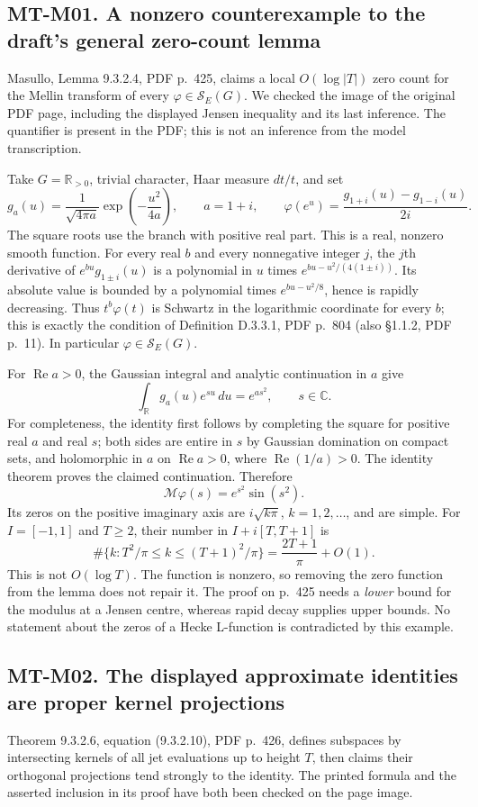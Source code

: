\documentclass[11pt,a4paper]{article}
\begin{document}
\subsection*{MT-M01. A nonzero counterexample to the draft's general zero-count lemma}
Masullo, Lemma 9.3.2.4, PDF p.~425, claims a local $O(\log |T|)$ zero count
for the Mellin transform of every $\varphi\in\mathcal S_E(G)$.
We checked the image of the original PDF page, including the displayed
Jensen inequality and its last inference.  The quantifier is present in the
PDF; this is not an inference from the model transcription.

Take $G=\mathbb R_{>0}$, trivial character, Haar measure $dt/t$, and set
\[
 g_a(u)=\frac{1}{\sqrt{4\pi a}}\exp\left(-\frac{u^2}{4a}\right),
 \qquad a=1+i,\qquad
 \varphi(e^u)=\frac{g_{1+i}(u)-g_{1-i}(u)}{2i}.
\]
The square roots use the branch with positive real part.  This is a real,
nonzero smooth function.  For every real $b$ and every nonnegative integer
$j$, the $j$th derivative of $e^{bu}g_{1\pm i}(u)$ is a polynomial in $u$
times $e^{bu-u^2/(4(1\pm i))}$.  Its absolute value is bounded by a
polynomial times $e^{bu-u^2/8}$, hence is rapidly decreasing.  Thus
$t^b\varphi(t)$ is Schwartz in the logarithmic coordinate for every $b$;
this is exactly the condition of Definition D.3.3.1, PDF p.~804 (also
\S1.1.2, PDF p.~11).  In particular $\varphi\in\mathcal S_E(G)$.

For $\operatorname{Re}a>0$, the Gaussian integral and analytic continuation
in $a$ give
\[
 \int_{\mathbb R}g_a(u)e^{su}\,du=e^{as^2},\qquad s\in\mathbb C.
\]
For completeness, the identity first follows by completing the square for
positive real $a$ and real $s$; both sides are entire in $s$ by Gaussian
domination on compact sets, and holomorphic in $a$ on
$\operatorname{Re}a>0$, where $\operatorname{Re}(1/a)>0$.  The identity
theorem proves the claimed continuation.  Therefore
\[
 \mathcal M\varphi(s)=e^{s^2}\sin(s^2).
\]
Its zeros on the positive imaginary axis are
$i\sqrt{k\pi}$, $k=1,2,\ldots$, and are simple.  For $I=[-1,1]$ and
$T\ge2$, their number in $I+i[T,T+1]$ is
\[
 \#\{k:T^2/\pi\le k\le(T+1)^2/\pi\}
   =\frac{2T+1}{\pi}+O(1).
\]
This is not $O(\log T)$.  The function is nonzero, so removing the zero
function from the lemma does not repair it.  The proof on p.~425 needs a
\emph{lower} bound for the modulus at a Jensen centre, whereas rapid decay
supplies upper bounds.  No statement about the zeros of a Hecke L-function
is contradicted by this example.

\subsection*{MT-M02. The displayed approximate identities are proper kernel projections}
Theorem 9.3.2.6, equation (9.3.2.10), PDF p.~426, defines subspaces by
intersecting kernels of all jet evaluations up to height $T$, then claims
their orthogonal projections tend strongly to the identity.  The printed
formula and the asserted inclusion in its proof have both been checked on
the page image.
\end{document}
